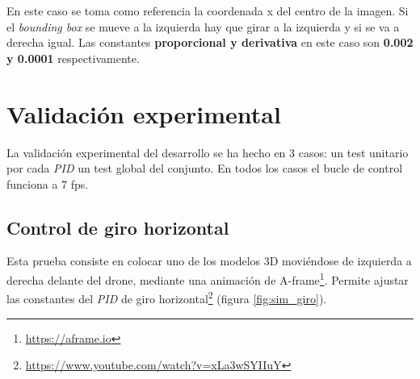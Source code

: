 En este caso se toma como referencia la coordenada x del centro de la imagen. Si el \textit{bounding box} se mueve a la izquierda hay que girar a la izquierda y si se va a derecha igual. Las constantes \textbf{proporcional y derivativa} en este caso son \textbf{0.002 y 0.0001} respectivamente.

\section{Validación experimental}
La validación experimental del desarrollo se ha hecho en 3 casos: un test unitario por cada \textit{PID}  un test global del conjunto. En todos los casos el bucle de control funciona a 7 \acrshort{fps}.

\subsection{Control de giro horizontal}
Esta prueba consiste en colocar uno de los modelos 3D moviéndose de izquierda a derecha delante del drone, mediante una animación de A-frame\footnote{\url{https://aframe.io}}. Permite ajustar las constantes del \textit{PID} de giro horizontal\footnote{\url{https://www.youtube.com/watch?v=xLa3wSYIIuY}} (figura \ref{fig:sim_giro}).


